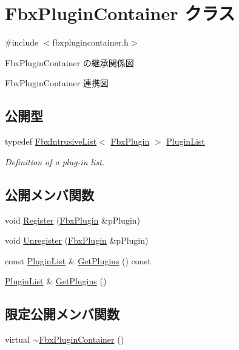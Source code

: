 \hypertarget{class_fbx_plugin_container}{}\section{Fbx\+Plugin\+Container クラス}
\label{class_fbx_plugin_container}


{\ttfamily \#include $<$fbxplugincontainer.\+h$>$}



Fbx\+Plugin\+Container の継承関係図


Fbx\+Plugin\+Container 連携図
\subsection*{公開型}
\begin{DoxyCompactItemize}
\item 
typedef \hyperlink{class_fbx_intrusive_list}{Fbx\+Intrusive\+List}$<$ \hyperlink{class_fbx_plugin}{Fbx\+Plugin} $>$ \hyperlink{class_fbx_plugin_container_a42abd8471efa91f56de2c4c64c220972}{Plugin\+List}
\begin{DoxyCompactList}\small\item\em Definition of a plug-\/in list. \end{DoxyCompactList}\end{DoxyCompactItemize}
\subsection*{公開メンバ関数}
\begin{DoxyCompactItemize}
\item 
void \hyperlink{class_fbx_plugin_container_a3fc28ffe0296973afb3014112b4b0df0}{Register} (\hyperlink{class_fbx_plugin}{Fbx\+Plugin} \&p\+Plugin)
\item 
void \hyperlink{class_fbx_plugin_container_af4b2068d41d0e87e97135e9effea55f7}{Unregister} (\hyperlink{class_fbx_plugin}{Fbx\+Plugin} \&p\+Plugin)
\item 
const \hyperlink{class_fbx_plugin_container_a42abd8471efa91f56de2c4c64c220972}{Plugin\+List} \& \hyperlink{class_fbx_plugin_container_a5fb043debeddd64f7e0f6c34b882b3a9}{Get\+Plugins} () const
\item 
\hyperlink{class_fbx_plugin_container_a42abd8471efa91f56de2c4c64c220972}{Plugin\+List} \& \hyperlink{class_fbx_plugin_container_a7afab0ebbb775ef23ea541bec3adc301}{Get\+Plugins} ()
\end{DoxyCompactItemize}
\subsection*{限定公開メンバ関数}
\begin{DoxyCompactItemize}
\item 
virtual \hyperlink{class_fbx_plugin_container_a8c4030ad7c08c7fdab1b34b7d37ed88e}{$\sim$\+Fbx\+Plugin\+Container} ()
\end{DoxyCompactItemize}
